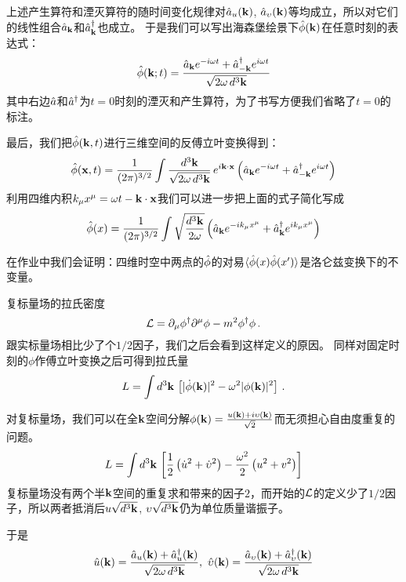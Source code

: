\documentclass[CJK]{beamer}
\begin{document}
\begin{frame}
\bch
上述产生算符和湮灭算符的随时间变化规律对$\hat{a}_u({\mathbf{k}})$, $\hat{a}_\upsilon({\mathbf{k}})$等均成立，所以对它们的线性组合$\hat{a}_{{\mathbf{k}}}$和${\hat{a}^\dagger}_{{\mathbf{k}}}$也成立。
于是我们可以写出海森堡绘景下$\hat{\phi}({\mathbf{k}})$在任意时刻的表达式：
$$\hat{\phi}({\mathbf{k}}; t) = \frac{\hat{a}_{{\mathbf{k}}}e^{-i\omega t} +{\hat{a}^\dagger}_{-{\mathbf{k}}}e^{i\omega t}}{\sqrt{2\omega\, d^3{\mathbf{k}}}}$$
其中右边$\hat{a}$和${\hat{a}^\dagger}$为$t=0$时刻的湮灭和产生算符，为了书写方便我们省略了$t=0$的标注。
\ech
\end{frame}

\begin{frame}
\bch
最后，我们把$\hat{\phi}({\mathbf{k}}, t)$进行三维空间的反傅立叶变换得到：
$$\hat{\phi}({\mathbf{x}}, t) = \frac{1}{(2\pi)^{3/2}}\int \frac{d^3{\mathbf{k}}}{\sqrt{2\omega\, d^3{\mathbf{k}}}} \, e^{i{\mathbf{k}}\cdot{\mathbf{x}}}\left(\hat{a}_{{\mathbf{k}}}e^{-i\omega t} +{\hat{a}^\dagger}_{-{\mathbf{k}}}e^{i\omega t}\right)$$
利用四维内积$k_\mu x^\mu = \omega t - {\mathbf{k}}\cdot {\mathbf{x}}$我们可以进一步把上面的式子简化写成
$$\hat{\phi}(x) = \frac{1}{(2\pi)^{3/2}} \int \sqrt{\frac{d^3{\mathbf{k}}}{2\omega}} \left(\hat{a}_{{\mathbf{k}}} e^{-ik_\mu x^\mu} + {\hat{a}^\dagger}_{{\mathbf{k}}}e^{ik_\mu x^\mu}\right) $$

\skipline
在作业中我们会证明：四维时空中两点的$\hat{\phi}$的对易$\langle \hat{\phi}(x)\hat{\phi}(x') \rangle$是洛仑兹变换下的不变量。
\ech
\end{frame}


\begin{frame}
\bch
复标量场的拉氏密度
$${\mathcal{L}} = \partial_\mu\phi^\dagger \partial^\mu \phi - m^2\phi^\dagger\phi\, .$$
跟实标量场相比少了个$1/2$因子，我们之后会看到这样定义的原因。
\skipline
同样对固定时刻的$\phi$作傅立叶变换之后可得到拉氏量
$$L = \int d^3{\mathbf{k}} \, \left[|\dot\phi({\mathbf{k}})|^2 - \omega^2|\phi({\mathbf{k}})|^2 \right]\, .$$
\ech
\end{frame}


\begin{frame}
\bch
对复标量场，我们可以在全${\mathbf{k}}$空间分解$\phi({\mathbf{k}}) = \frac{u({\mathbf{k}}) + i \upsilon({\mathbf{k}})}{\sqrt{2}}$而无须担心自由度重复的问题。
$$L = \int d^3{\mathbf{k}}\,\left[ \frac{1}{2}\left(\dot u^2 + \dot {\upsilon}^2 \right) - \frac{\omega^2}{2}\left(u^2+v^2\right)\right]$$
复标量场没有两个半${\mathbf{k}}$空间的重复求和带来的因子$2$，而开始的${\mathcal{L}}$的定义少了$1/2$因子，所以两者抵消后$u\sqrt{d^3{\mathbf{k}}}$, $\upsilon\sqrt{d^3{\mathbf{k}}}$仍为单位质量谐振子。

于是
$$\hat{u}(\veck)  = \frac{\hata_u(\veck) + \adag_u(\veck)}{\sqrt{2\omega\, d^3\veck}},\ \hat{\vel}(\veck)  = \frac{\hata_{\vel}(\veck) + \adag_{\vel}(\veck)}{\sqrt{2\omega\, d^3\veck}}$$

\ech
\end{frame}
\end{document}
